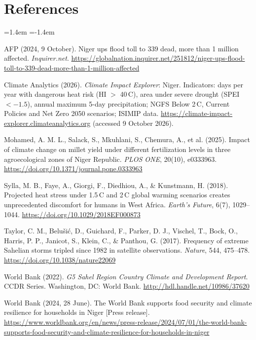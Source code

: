 \documentclass[10pt,a4paper]{article}
\newcommand{\degC}{\,\textdegree C}
\begin{document}
\section{References}
{\small
\begin{list}{}{\leftmargin=1.4em \itemindent=-1.4em \itemsep=5pt \parsep=0pt}
\item AFP (2024, 9 October). Niger ups flood toll to 339 dead, more than 1 million affected.
      \emph{Inquirer.net}.
      \url{https://globalnation.inquirer.net/251812/niger-ups-flood-toll-to-339-dead-more-than-1-million-affected}
\item Climate Analytics (2026). \emph{Climate Impact Explorer}: Niger. Indicators: days per year with
      dangerous heat risk (HI $>$ 40\degC), area under severe drought (SPEI $< -1.5$), annual maximum 5-day
      precipitation; NGFS Below 2\degC, Current Policies and Net Zero 2050 scenarios; ISIMIP data.
      \url{https://climate-impact-explorer.climateanalytics.org} (accessed 9 October 2026).
\item Mohamed, A. M. L., Salack, S., Mkuhlani, S., Chemura, A., et al. (2025). Impact of climate change on
      millet yield under different fertilization levels in three agroecological zones of Niger Republic.
      \emph{PLOS ONE}, 20(10), e0333963. \url{https://doi.org/10.1371/journal.pone.0333963}
\item Sylla, M. B., Faye, A., Giorgi, F., Diedhiou, A., \& Kunstmann, H. (2018). Projected heat stress under
      1.5\degC{} and 2\degC{} global warming scenarios creates unprecedented discomfort for humans in West
      Africa. \emph{Earth's Future}, 6(7), 1029--1044. \url{https://doi.org/10.1029/2018EF000873}
\item Taylor, C. M., Belu\v{s}i\'{c}, D., Guichard, F., Parker, D. J., Vischel, T., Bock, O., Harris, P. P.,
      Janicot, S., Klein, C., \& Panthou, G. (2017). Frequency of extreme Sahelian storms tripled since 1982 in
      satellite observations. \emph{Nature}, 544, 475--478. \url{https://doi.org/10.1038/nature22069}
\item World Bank (2022). \emph{G5 Sahel Region Country Climate and Development Report}. CCDR Series.
      Washington, DC: World Bank. \url{http://hdl.handle.net/10986/37620}
\item World Bank (2024, 28 June). The World Bank supports food security and climate resilience for households
      in Niger [Press release].
      \url{https://www.worldbank.org/en/news/press-release/2024/07/01/the-world-bank-supports-food-security-and-climate-resilience-for-households-in-niger}
\end{list}}
\end{document}
